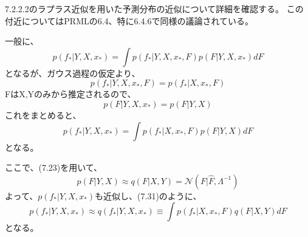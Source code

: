 ﻿\documentclass{jsarticle}
\begin{document}
7.2.2.2のラプラス近似を用いた予測分布の近似について詳細を確認する。
この付近についてはPRMLの6.4、特に6.4.6で同様の議論されている。

一般に、
\begin{equation}
p(f_* | Y, X, x_*) = \int p(f_* | Y, X, x_*, F) p(F | Y, X, x_*)dF
\end{equation}
となるが、ガウス過程の仮定より、
\begin{equation}
p(f_* | Y, X, x_*, F) = p(f_* | X, x_*, F)
\end{equation}
FはX,Yのみから推定されるので、
\begin{equation}
p(F | Y, X, x_*) = p(F | Y, X)
\end{equation}
これをまとめると、
\begin{equation}
p(f_* | Y, X, x_*) = \int p(f_* | X, x_*, F) p(F | Y, X)dF
\end{equation}
となる。

ここで、(7.23)を用いて、
\begin{equation}
p(F | Y, X) \approx q(F | X, Y) = \mathcal{N}(F | \hat{F}, \Lambda^{-1})
\end{equation}
よって、$p(f_* | Y, X, x_*)$も近似し、(7.31)のように、
\begin{equation}
p(f_* | Y, X, x_*) \approx q(f_* | Y, X, x_*) \equiv \int p(f_* | X, x_*, F) q(F | X, Y)dF
\end{equation}
となる。
\end{document}
